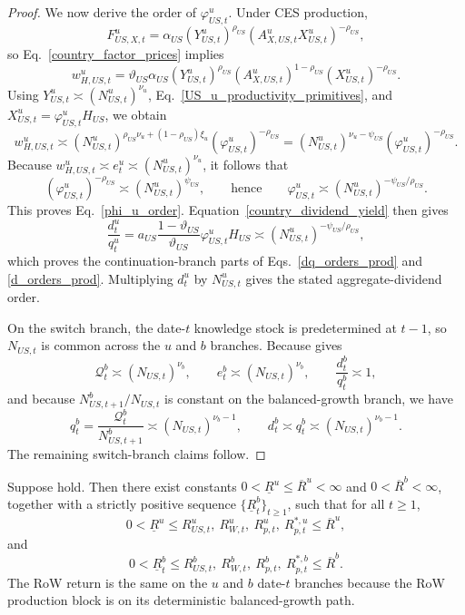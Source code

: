 \documentclass{article}
\begin{document}
\begin{proof}
We now derive the order of $\varphi_{US,t}^u$. Under CES production,
\[
F_{US,X,t}^u
=\alpha_{US}(Y_{US,t}^u)^{\rho_{US}}(A_{X,US,t}^uX_{US,t}^u)^{-\rho_{US}},
\]
so Eq.~\eqref{country_factor_prices} implies
\[
w_{H,US,t}^u
=
\vartheta_{US}\alpha_{US}
(Y_{US,t}^u)^{\rho_{US}}
(A_{X,US,t}^u)^{1-\rho_{US}}
(X_{US,t}^u)^{-\rho_{US}}.
\]
Using $Y_{US,t}^u\asymp (N_{US,t}^u)^{\nu_u}$, Eq.~\eqref{US_u_productivity_primitives}, and $X_{US,t}^u=\varphi_{US,t}^uH_{US}$, we obtain
\[
w_{H,US,t}^u
\asymp
(N_{US,t}^u)^{\rho_{US}\nu_u+(1-\rho_{US})\xi_u}
(\varphi_{US,t}^u)^{-\rho_{US}}
=
(N_{US,t}^u)^{\nu_u-\psi_{US}}(\varphi_{US,t}^u)^{-\rho_{US}}.
\]
Because $w_{H,US,t}^u\asymp e_t^u\asymp (N_{US,t}^u)^{\nu_u}$, it follows that
\[
(\varphi_{US,t}^u)^{-\rho_{US}}\asymp (N_{US,t}^u)^{\psi_{US}},
\qquad\text{hence}\qquad
\varphi_{US,t}^u\asymp (N_{US,t}^u)^{-\psi_{US}/\rho_{US}}.
\]
This proves Eq.~\eqref{phi_u_order}. Equation~\eqref{country_dividend_yield} then gives
\[
\frac{d_t^u}{q_t^u}
=
a_{US}\frac{1-\vartheta_{US}}{\vartheta_{US}}\varphi_{US,t}^uH_{US}
\asymp (N_{US,t}^u)^{-\psi_{US}/\rho_{US}},
\]
which proves the continuation-branch parts of Eqs.~\eqref{dq_orders_prod} and \eqref{d_orders_prod}. Multiplying $d_t^u$ by $N_{US,t}^u$ gives the stated aggregate-dividend order.

On the switch branch, the date-$t$ knowledge stock is predetermined at $t-1$, so $N_{US,t}$ is common across the $u$ and $b$ branches. Because  gives
\[
\mathcal Q_t^b\asymp (N_{US,t})^{\nu_b},
\qquad
e_t^b\asymp (N_{US,t})^{\nu_b},
\qquad
\frac{d_t^b}{q_t^b}\asymp 1,
\]
and because $N_{US,t+1}^b/N_{US,t}$ is constant on the balanced-growth branch, we have
\[
q_t^b=\frac{\mathcal Q_t^b}{N_{US,t+1}^b}\asymp (N_{US,t})^{\nu_b-1},
\qquad
d_t^b\asymp q_t^b\asymp (N_{US,t})^{\nu_b-1}.
\]
The remaining switch-branch claims follow.
\end{proof}

\begin{lem}\label{lem_risky_return_bounds}
Suppose  hold. Then there exist constants $0<\underline R^u\le \overline R^u<\infty$ and $0<\overline R^b<\infty$, together with a strictly positive sequence $\{\underline R_t^b\}_{t\ge 1}$, such that for all $t\ge 1$,
\[
0<\underline R^u
\le
R_{US,t}^u,\ R_{W,t}^u,\ R_{p,t}^u,\ R_{p,t}^{*,u}
\le
\overline R^u,
\]
and
\[
0<\underline R_t^b
\le
R_{US,t}^b,\ R_{W,t}^b,\ R_{p,t}^b,\ R_{p,t}^{*,b}
\le
\overline R^b.
\]
The RoW return is the same on the $u$ and $b$ date-$t$ branches because the RoW production block is on its deterministic balanced-growth path.
\end{lem}
\end{document}
